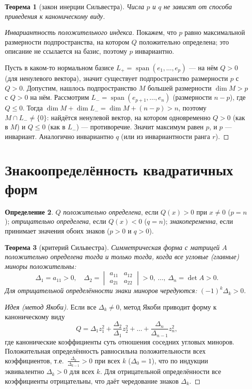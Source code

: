 \documentclass[11pt,a4paper]{article}
\theoremstyle{definition}
\newtheorem{definition}{Определение}[section]
\theoremstyle{plain}
\newtheorem{theorem}[definition]{Теорема}
\DeclareMathOperator{\Span}{span}
\renewcommand{\le}{\leqslant}
\begin{document}
\begin{theorem}[закон инерции Сильвестра]
Числа $p$ и $q$ не зависят от способа приведения к каноническому виду.
\end{theorem}

\begin{proof}[Инвариантность положительного индекса]
Покажем, что $p$ равно максимальной размерности подпространства, на котором $Q$ положительно
определена; это описание не ссылается на базис, поэтому $p$ инвариантно.

Пусть в каком-то нормальном базисе $L_+=\Span(e_1,\dots,e_p)$ — на нём $Q>0$ (для ненулевого
вектора), значит существует подпространство размерности $p$ с $Q>0$. Допустим, нашлось
подпространство $M$ большей размерности $\dim M>p$ с $Q>0$ на нём. Рассмотрим
$L_-=\Span(e_{p+1},\dots,e_n)$ (размерности $n-p$), где $Q\le0$. Тогда
$\dim M+\dim L_-=\dim M+(n-p)>n$, поэтому $M\cap L_-\ne\{0\}$: найдётся ненулевой вектор, на котором
одновременно $Q>0$ (как в $M$) и $Q\le0$ (как в $L_-$) — противоречие. Значит максимум равен $p$, и
$p$ — инвариант. Аналогично инвариантно $q$ (или из инвариантности ранга $r$).
\end{proof}

\section{Знакоопределённость квадратичных форм}

\begin{definition}
$Q$ \emph{положительно определена}, если $Q(x)>0$ при $x\ne0$ ($p=n$); \emph{отрицательно
определена}, если $Q(x)<0$ ($q=n$); \emph{знакопеременна}, если принимает значения обоих знаков
($p>0$ и $q>0$).
\end{definition}

\begin{theorem}[критерий Сильвестра]
Симметрическая форма с матрицей $A$ положительно определена тогда и только тогда, когда все
\emph{угловые} (главные) миноры положительны:
\[
  \Delta_1=a_{11}>0,\quad\Delta_2=\begin{vmatrix}a_{11}&a_{12}\\a_{21}&a_{22}\end{vmatrix}>0,\ \dots,\ \Delta_n=\det A>0 .
\]
Для отрицательной определённости знаки миноров чередуются: $(-1)^k\Delta_k>0$.
\end{theorem}

\begin{proof}[Идея (метод Якоби)]
Если все $\Delta_k\ne0$, метод Якоби приводит форму к каноническому виду
\[
  Q=\Delta_1 z_1^2+\frac{\Delta_2}{\Delta_1}z_2^2+\dots+\frac{\Delta_n}{\Delta_{n-1}}z_n^2 ,
\]
где канонические коэффициенты суть отношения соседних угловых миноров. Положительная определённость
равносильна положительности всех коэффициентов, т.е.\ $\tfrac{\Delta_k}{\Delta_{k-1}}>0$ при всех
$k$ ($\Delta_0=1$), что по индукции эквивалентно $\Delta_k>0$ для всех $k$. Для отрицательной
определённости все коэффициенты отрицательны, что даёт чередование знаков $\Delta_k$.
\end{proof}
\end{document}
